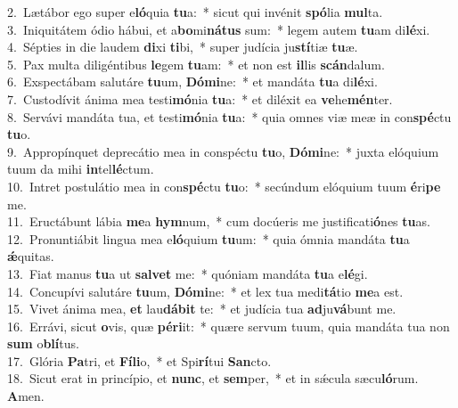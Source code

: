{2.~}Lætábor ego super e\textbf{ló}quia \textbf{tu}a:~* sicut qui invénit \textbf{spó}lia \textbf{mul}ta.\\
{3.~}Iniquitátem ódio hábui, et a\textbf{bo}mi\textbf{ná}\textbf{tus} sum:~* legem autem \textbf{tu}am di\textbf{lé}xi.\\
{4.~}Sépties in die laudem \textbf{di}xi \textbf{ti}bi,~* super judícia ju\textbf{stí}tiæ \textbf{tu}æ.\\
{5.~}Pax multa diligéntibus \textbf{le}gem \textbf{tu}am:~* et non est \textbf{il}lis \textbf{scán}dalum.\\
{6.~}Exspectábam salutáre \textbf{tu}um, \textbf{Dó}\textbf{mi}ne:~* et mandáta \textbf{tu}a di\textbf{lé}xi.\\
{7.~}Custodívit ánima mea testi\textbf{mó}nia \textbf{tu}a:~* et diléxit ea \textbf{ve}he\textbf{mén}ter.\\
{8.~}Servávi mandáta tua, et testi\textbf{mó}nia \textbf{tu}a:~* quia omnes viæ meæ in con\textbf{spé}ctu \textbf{tu}o.\\
{9.~}Appropínquet deprecátio mea in conspéctu \textbf{tu}o, \textbf{Dó}\textbf{mi}ne:~* juxta elóquium tuum da mihi \textbf{in}tel\textbf{lé}ctum.\\
{10.~}Intret postulátio mea in con\textbf{spé}ctu \textbf{tu}o:~* secúndum elóquium tuum \textbf{é}ri\textbf{pe} me.\\
{11.~}Eructábunt lábia \textbf{me}a \textbf{hym}num,~* cum docúeris me justificati\textbf{ó}nes \textbf{tu}as.\\
{12.~}Pronuntiábit lingua mea e\textbf{ló}quium \textbf{tu}um:~* quia ómnia mandáta \textbf{tu}a \textbf{ǽ}quitas.\\
{13.~}Fiat manus \textbf{tu}a ut \textbf{sal}\textbf{vet} me:~* quóniam mandáta \textbf{tu}a e\textbf{lé}gi.\\
{14.~}Concupívi salutáre \textbf{tu}um, \textbf{Dó}\textbf{mi}ne:~* et lex tua medi\textbf{tá}tio \textbf{me}a est.\\
{15.~}Vivet ánima mea, \textbf{et} lau\textbf{dá}\textbf{bit} te:~* et judícia tua \textbf{ad}ju\textbf{vá}bunt me.\\
{16.~}Errávi, sicut \textbf{o}vis, quæ \textbf{pé}\textbf{ri}it:~* quære servum tuum, quia mandáta tua non \textbf{sum} o\textbf{blí}tus.\\
{17.~}Glória \textbf{Pa}tri, et \textbf{Fí}\textbf{li}o,~* et Spi\textbf{rí}tui \textbf{San}cto.\\
{18.~}Sicut erat in princípio, et \textbf{nunc}, et \textbf{sem}per,~* et in sǽcula sæcu\textbf{ló}rum. \textbf{A}men.\\
